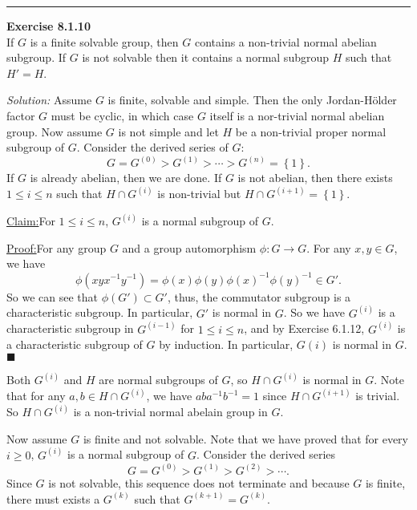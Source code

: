 \documentclass[a4paper, 12pt]{article}
\newenvironment{problem}[2][Exercise]
    { \begin{mdframed}[backgroundcolor=gray!20] \textbf{#1 #2} \\}
    {  \end{mdframed}}
\newenvironment{solution}
    {\textit{Solution:}}
    {}
\newenvironment{claim}[1]{\par\noindent\underline{Claim:}\space#1}{}
\newenvironment{claimproof}[1]{\par\noindent\underline{Proof:}\space#1}{\hfill $\blacksquare$}
\begin{document}
\noindent\rule{7in}{2.8pt}
\begin{problem}{8.1.10}
If \(G\) is a finite solvable group, then \(G\) contains a non-trivial normal abelian subgroup. If \(G\) is not solvable then it contains a normal subgroup \(H\) such that 
\(H'=H\).
\end{problem}
\begin{solution}
Assume \(G\) is finite, solvable and simple. Then the only Jordan-H\"{o}lder factor \(G\) must be cyclic, in which case \(G\) itself is a nor-trivial normal abelian group. Now assume \(G\) is not simple and let \(H\) be 
a non-trivial proper normal subgroup of \(G\). Consider the derived series of \(G\):
\[G=G^{(0)}>G^{(1)}>\cdots>G^{(n)}=\left\{ 1 \right\}.\]
If \(G\) is already abelian, then we are done. If \(G\) is not abelian, then there exists \(1\leq i\leq n\) such that \(H\cap G^{(i)}\) is non-trivial but \(H\cap G^{(i+1)}=\left\{ 1 \right\}\).

\begin{claim}
For \(1\leq i\leq n\), \(G^{(i)}\) is a normal subgroup of \(G\).
\end{claim}
\begin{claimproof}
For any group \(G\) and a group automorphism \(\phi:G\rightarrow G\). For any \(x,y\in G\), we have 
\[\phi(xyx^{-1}y^{-1})=\phi(x)\phi(y)\phi(x)^{-1}\phi(y)^{-1}\in G'.\]
So we can see that \(\phi(G')\subset G'\), thus, the commutator subgroup is a characteristic subgroup. In particular, \(G'\) is normal in \(G\). So 
we have \(G^{(i)}\) is a characteristic subgroup in \(G^{(i-1)}\) for \(1\leq i\leq n\), and by Exercise 6.1.12, \(G^{(i)}\) is a characteristic subgroup of \(G\) by induction. 
In particular, \(G{(i)}\) is normal in \(G\).   
\end{claimproof}

Both \(G^{(i)}\) and \(H\) are normal subgroups of \(G\), so \(H\cap G^{(i)}\) is normal in \(G\). Note that for any \(a,b\in H\cap G^{(i)}\), we have \(aba^{-1}b^{-1}=1\) since \(H\cap G^{(i+1)}\) is trivial. 
So \(H\cap G^{(i)}\) is a non-trivial normal abelain group in \(G\).

Now assume \(G\) is finite and not solvable. Note that we have proved that for every \(i\geq 0\), \(G^{(i)}\) is a normal subgroup of \(G\). Consider the derived series 
\[G=G^{(0)}>G^{(1)}>G^{(2)}>\cdots.\]
Since \(G\) is not solvable, this sequence does not terminate and because \(G\) is finite, there must exists a \(G^{(k)}\) such that \(G^{(k+1)}=G^{(k)}\).
\end{solution}
\end{document}
